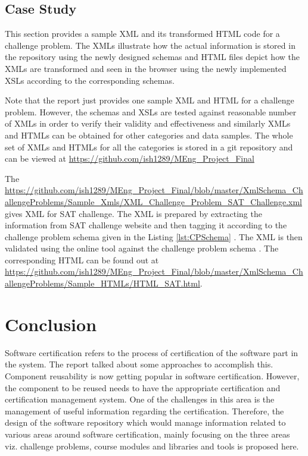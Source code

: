 \documentclass[11pt,letterpaper]{report}
\begin{document}
\section{Case Study}
This section provides a sample XML and its transformed HTML code for a challenge problem. The XMLs illustrate how the actual information is stored in the repository using the newly designed schemas and HTML files depict how the XMLs are transformed and seen in the browser using the newly implemented XSLs according to the corresponding schemas. 

Note that the report just provides one sample XML and HTML for a challenge problem. However, the schemas and XSLs are tested against reasonable number of XMLs in order to verify their validity and effectiveness and similarly XMLs and HTMLs can be obtained for other categories and data samples. The whole set of XMLs and HTMLs for all the categories is stored in a git repository and can be viewed at \url{https://github.com/ish1289/MEng_Project_Final}

The \url{https://github.com/ish1289/MEng_Project_Final/blob/master/XmlSchema_ChallengeProblems/Sample_Xmls/XML_Challenge_Problem_SAT_Challenge.xml} gives XML for SAT challenge. The XML is prepared by extracting the information from SAT challenge website and then tagging it according to the challenge problem schema given in the Listing \ref{lst:CPSchema} \cite{SAT}. The XML is then validated using the online tool against the challenge problem schema \cite{olXSD}. The corresponding HTML can be found out at \newline \url{https://github.com/ish1289/MEng_Project_Final/blob/master/XmlSchema_ChallengeProblems/Sample_HTMLs/HTML_SAT.html}.

\chapter{Conclusion}
Software certification refers to the process of certification of the software part in the system. The report talked about some approaches to accomplish this. Component reusability is now getting popular in software certification. However, the component to be reused needs to have the appropriate certification and certification management system. One of the challenges in this area is the management of useful information regarding the certification. Therefore, the design of the software repository which would manage information related to various areas around software certification, mainly focusing on the three areas viz. challenge problems, course modules and libraries and tools is proposed here.  
\end{document}
